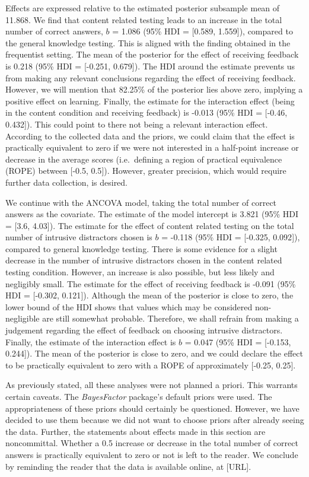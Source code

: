 \documentclass[../main.tex]{subfiles}
\begin{document}
Effects are expressed relative to the estimated posterior subsample mean
of 11.868. We find that content related testing leads to an increase in
the total number of correct answers, \(b\) = 1.086 (95\% HDI = {[}0.589,
1.559{]}), compared to the general knowledge testing. This is aligned
with the finding obtained in the frequentist setting. The mean of the
posterior for the effect of receiving feedback is 0.218 (95\% HDI =
{[}-0.251, 0.679{]}). The HDI around the estimate prevents us from
making any relevant conclusions regarding the effect of receiving
feedback. However, we will mention that 82.25\% of the posterior lies
above zero, implying a positive effect on learning. Finally, the
estimate for the interaction effect (being in the content condition and
receiving feedback) is -0.013 (95\% HDI = {[}-0.46, 0.432{]}). This
could point to there not being a relevant interaction effect. According
to the collected data and the priors, we could claim that the effect is
practically equivalent to zero if we were not interested in a half-point
increase or decrease in the average scores (i.e.~defining a region of
practical equivalence (ROPE) between {[}-0.5, 0.5{]}). However, greater
precision, which would require further data collection, is desired.

We continue with the ANCOVA model, taking the total number of correct
answers as the covariate. The estimate of the model intercept is 3.821
(95\% HDI = {[}3.6, 4.03{]}). The estimate for the effect of content
related testing on the total number of intrusive distractors chosen is
\(b\) = -0.118 (95\% HDI = {[}-0.325, 0.092{]}), compared to general
knowledge testing. There is some evidence for a slight decrease in the
number of intrusive distractors chosen in the content related testing
condition. However, an increase is also possible, but less likely and
negligibly small. The estimate for the effect of receiving feedback is
-0.091 (95\% HDI = {[}-0.302, 0.121{]}). Although the mean of the
posterior is close to zero, the lower bound of the HDI shows that values
which may be considered non-negligible are still somewhat probable.
Therefore, we shall refrain from making a judgement regarding the effect
of feedback on choosing intrusive distractors. Finally, the estimate of
the interaction effect is \(b\) = 0.047 (95\% HDI = {[}-0.153,
0.244{]}). The mean of the posterior is close to zero, and we could
declare the effect to be practically equivalent to zero with a ROPE of
approximately {[}-0.25, 0.25{]}.

As previously stated, all these analyses were not planned a priori. This
warrants certain caveats. The \textit{BayesFactor} package's default
priors were used. The appropriateness of these priors should certainly
be questioned. However, we have decided to use them because we did not
want to choose priors after already seeing the data. Further, the
statements about effects made in this section are noncommittal. Whether
a 0.5 increase or decrease in the total number of correct answers is
practically equivalent to zero or not is left to the reader. We conclude
by reminding the reader that the data is available online, at {[}URL{]}.
\end{document}
